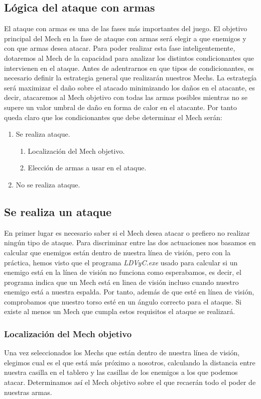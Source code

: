 \documentclass[a4paper,12pt,oneside]{book}
\begin{document}
\subsection{Lógica del ataque con armas}
El ataque con armas es una de las fases más importantes del juego.  El objetivo principal del Mech en la fase de ataque con armas será elegir a que enemigos y con que armas desea atacar.
Para poder realizar esta fase inteligentemente, dotaremos al Mech de la capacidad para analizar los distintos condicionantes que intervienen en el ataque. 
Antes de adentrarnos en que tipos de condicionantes, es necesario definir la estrategia general que realizarán nuestros Mechs. La estrategía será maximizar el daño sobre el atacado minimizando los daños en el atacante, es decir, atacaremos al Mech objetivo con todas las armas posibles mientras no se supere un valor umbral de daño en forma de calor en el atacante. 
Por tanto queda claro que los condicionantes que debe determinar el Mech serán:
\begin{enumerate}
\item Se realiza ataque.
\begin{enumerate}
\item Localización del Mech objetivo.
\item Elección de armas a usar en el ataque.
\end{enumerate}
\item No se realiza ataque.
\end{enumerate}
\subsection*{Se realiza un ataque}
En primer lugar es necesario saber si el Mech desea atacar o prefiero no realizar ningún tipo de ataque. Para discriminar entre las dos actuaciones nos basamos en calcular que enemigos están dentro de nuestra línea de visión, pero con la práctica, hemos visto que el programa \textit{LDVyC.exe} usado para calcular si un enemigo está en la línea de visión no funciona como esperabamos, es decir, el programa indica que un Mech está en linea de visión incluso cuando nuestro enemigo está a nuestra espalda. Por tanto, además de que esté en línea de visión, comprobamos que nuestro torso esté en un ángulo correcto para el ataque. Si existe al menos un Mech que cumpla estos requisitos el ataque se realizará. 

\subsubsection*{Localización del Mech objetivo}
Una vez seleccionados los Mechs que están dentro de nuestra línea de visión, elegimos cual es el que está más próximo a nosotros, calculando la distancia entre nuestra casilla en el tablero y las casillas de los enemigos a los que podemos atacar. Determinamos así el Mech objetivo sobre el que recaerán todo el poder de nuestras armas.
\end{document}
